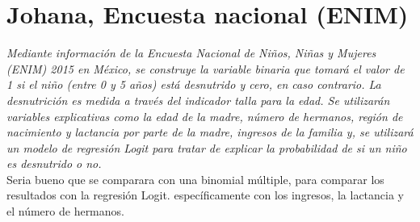 \documentclass[]{article}
\begin{document}
\section{Johana, Encuesta nacional (ENIM)}
\emph{Mediante información de la Encuesta Nacional de Niños, Niñas y Mujeres (ENIM) 2015 en México, se construye la variable binaria que tomará el valor de 1 si el niño (entre 0 y 5 años) está desnutrido y cero, en caso contrario. La desnutrición es medida a través del indicador talla para la edad. Se utilizarán variables explicativas como la edad de la madre, número de hermanos, región de nacimiento y lactancia por parte de la madre, ingresos de la familia y, se utilizará un modelo de regresión Logit para tratar de explicar la probabilidad de si un niño es desnutrido o no.}\\


Seria bueno que se comparara con una binomial múltiple, para comparar los resultados con la regresión Logit. específicamente con los ingresos, la lactancia y el número de hermanos.

\printbibliography[title={Referencias}]
\end{document}
